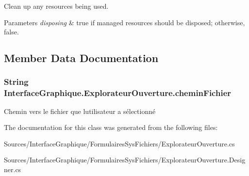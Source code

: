 Clean up any resources being used. 


\begin{DoxyParams}{Parameters}
{\em disposing} & true if managed resources should be disposed; otherwise, false.\\
\hline
\end{DoxyParams}


\subsection{Member Data Documentation}
\subsubsection[{\texorpdfstring{chemin\+Fichier}{cheminFichier}}]{\setlength{\rightskip}{0pt plus 5cm}String Interface\+Graphique.\+Explorateur\+Ouverture.\+chemin\+Fichier}\hypertarget{class_interface_graphique_1_1_explorateur_ouverture_a38a03f28bca88334c4b4fb271af7b84e}{}\label{class_interface_graphique_1_1_explorateur_ouverture_a38a03f28bca88334c4b4fb271af7b84e}


Chemin vers le fichier que l\textquotesingle{}utilisateur a sélectionné 



The documentation for this class was generated from the following files\+:\begin{DoxyCompactItemize}
\item 
Sources/\+Interface\+Graphique/\+Formulaires\+Sys\+Fichiers/Explorateur\+Ouverture.\+cs\item 
Sources/\+Interface\+Graphique/\+Formulaires\+Sys\+Fichiers/Explorateur\+Ouverture.\+Designer.\+cs\end{DoxyCompactItemize}
